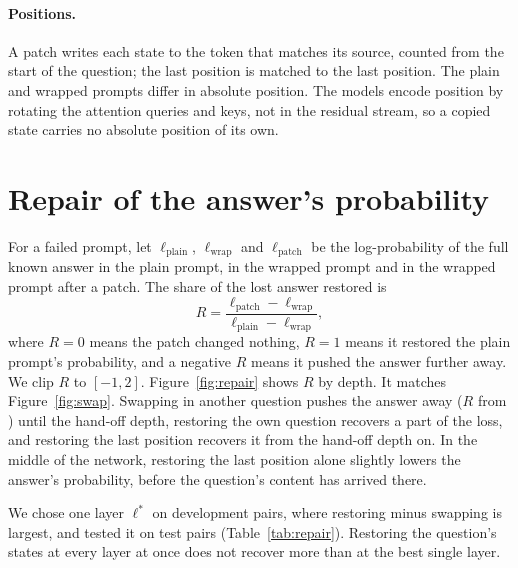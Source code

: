 \paragraph{Positions.} A patch writes each state to the token that matches its source, counted from the start of the question; the last position is matched to the last position. The plain and wrapped prompts differ in absolute position. The models encode position by rotating the attention queries and keys, not in the residual stream, so a copied state carries no absolute position of its own.

\section{Repair of the answer's probability}
\label{app:repair}
For a failed prompt, let $\ell_{\text{plain}}$, $\ell_{\text{wrap}}$ and $\ell_{\text{patch}}$ be the log-probability of the full known answer in the plain prompt, in the wrapped prompt and in the wrapped prompt after a patch. The share of the lost answer restored is
\begin{equation}
R = \frac{\ell_{\text{patch}} - \ell_{\text{wrap}}}{\ell_{\text{plain}} - \ell_{\text{wrap}}},
\label{eq:repair}
\end{equation}
where $R = 0$ means the patch changed nothing, $R = 1$ means it restored the plain prompt's probability, and a negative $R$ means it pushed the answer further away. We clip $R$ to $[-1, 2]$. Figure~\ref{fig:repair} shows $R$ by depth. It matches Figure~\ref{fig:swap}. Swapping in another question pushes the answer away ($R$ from \DStarNeg{}) until the hand-off depth, restoring the own question recovers a part of the loss, and restoring the last position recovers it from the hand-off depth on. In the middle of the network, restoring the last position alone slightly lowers the answer's probability, before the question's content has arrived there.

We chose one layer $\ell^*$ on development pairs, where restoring minus swapping is largest, and tested it on test pairs (Table~\ref{tab:repair}). Restoring the question's states at every layer at once does not recover more than at the best single layer.



\begin{table}[h]
\centering
\scriptsize
\setlength{\tabcolsep}{2.5pt}

\caption{\textbf{Repair at $\ell^*$}, test pairs, with 95\% intervals. Own: own question restored. Other: other question swapped in. All layers: own question restored at every layer at once.}
\label{tab:repair}
\end{table}
